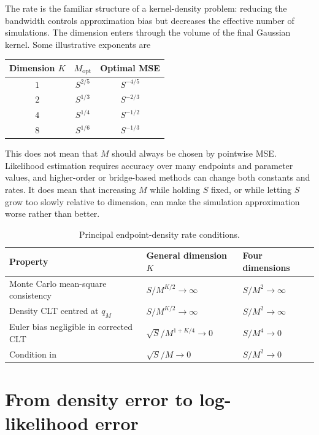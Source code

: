 \documentclass[11pt]{article}
\theoremstyle{definition}
\begin{document}
The rate is the familiar structure of a kernel-density problem: reducing the bandwidth controls approximation bias but decreases the effective number of simulations. The dimension enters through the volume of the final Gaussian kernel. Some illustrative exponents are
\begin{center}
\begin{tabular}{ccc}
\toprule
Dimension $K$ & $M_{\mathrm{opt}}$ & Optimal MSE \\
\midrule
$1$ & $S^{2/5}$ & $S^{-4/5}$ \\
$2$ & $S^{1/3}$ & $S^{-2/3}$ \\
$4$ & $S^{1/4}$ & $S^{-1/2}$ \\
$8$ & $S^{1/6}$ & $S^{-1/3}$ \\
\bottomrule
\end{tabular}
\end{center}

This does not mean that $M$ should always be chosen by pointwise MSE. Likelihood estimation requires accuracy over many endpoints and parameter values, and higher-order or bridge-based methods can change both constants and rates. It does mean that increasing $M$ while holding $S$ fixed, or while letting $S$ grow too slowly relative to dimension, can make the simulation approximation worse rather than better.

\begin{table}[t]
\centering
\caption{Principal endpoint-density rate conditions.}
\label{tab:rates}
\begin{tabular}{lll}
\toprule
Property & General dimension $K$ & Four dimensions \\
\midrule
Monte Carlo mean-square consistency
& $S/M^{K/2}\to\infty$ & $S/M^2\to\infty$ \\
Density CLT centred at $q_M$
& $S/M^{K/2}\to\infty$ & $S/M^2\to\infty$ \\
Euler bias negligible in corrected CLT
& $\sqrt S/M^{1+K/4}\to0$ & $S/M^4\to0$ \\
Condition in \citet{BrandtSantaClara2002}
& $\sqrt S/M\to0$ & $S/M^2\to0$ \\
\bottomrule
\end{tabular}
\end{table}

\section{From density error to log-likelihood error}\label{sec:loglik}
\end{document}
